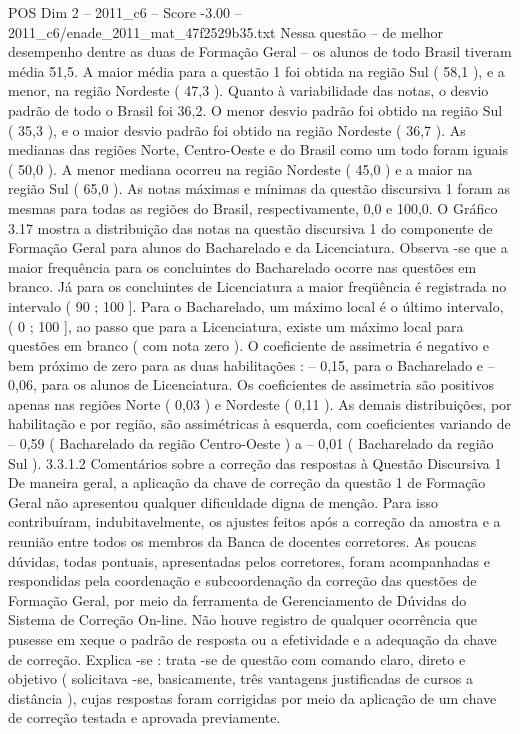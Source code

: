 \begin{textsample}{POS Dim 2 – 2011\_c6 – Score -3.00 – 2011\_c6/enade\_2011\_mat\_47f2529b35.txt}
Nessa questão – de melhor desempenho dentre as duas de Formação Geral – os alunos de todo Brasil tiveram média 51,5.
A maior média para a questão 1 foi obtida na região Sul ( 58,1 ), e a menor, na região Nordeste ( 47,3 ).
Quanto à variabilidade das notas, o desvio padrão de todo o Brasil foi 36,2.
O menor desvio padrão foi obtido na região Sul ( 35,3 ), e o maior desvio padrão foi obtido na região Nordeste ( 36,7 ).
As medianas das regiões Norte, Centro-Oeste e do Brasil como um todo foram iguais ( 50,0 ).
A menor mediana ocorreu na região Nordeste ( 45,0 ) e a maior na região Sul ( 65,0 ).
As notas máximas e mínimas da questão discursiva 1 foram as mesmas para todas as regiões do Brasil, respectivamente, 0,0 e 100,0.
O Gráfico 3.17 mostra a distribuição das notas na questão discursiva 1 do componente de Formação Geral para alunos do Bacharelado e da Licenciatura.
Observa -se que a maior frequência para os concluintes do Bacharelado ocorre nas questões em branco.
Já para os concluintes de Licenciatura a maior freqüência é registrada no intervalo ( 90 ; 100 ].
Para o Bacharelado, um máximo local é o último intervalo, ( 0 ; 100 ], ao passo que para a Licenciatura, existe um máximo local para questões em branco ( com nota zero ).
O coeficiente de assimetria é negativo e bem próximo de zero para as duas habilitações : – 0,15, para o Bacharelado e – 0,06, para os alunos de Licenciatura.
Os coeficientes de assimetria são positivos apenas nas regiões Norte ( 0,03 ) e Nordeste ( 0,11 ).
As demais distribuições, por habilitação e por região, são assimétricas à esquerda, com coeficientes variando de – 0,59 ( Bacharelado da região Centro-Oeste ) a – 0,01 ( Bacharelado da região Sul ). 3.3.1.2 Comentários sobre a correção das respostas à Questão Discursiva 1 De maneira geral, a aplicação da chave de correção da questão 1 de Formação Geral não apresentou qualquer dificuldade digna de menção.
Para isso contribuíram, indubitavelmente, os ajustes feitos após a correção da amostra e a reunião entre todos os membros da Banca de docentes corretores.
As poucas dúvidas, todas pontuais, apresentadas pelos corretores, foram acompanhadas e respondidas pela coordenação e subcoordenação da correção das questões de Formação Geral, por meio da ferramenta de Gerenciamento de Dúvidas do Sistema de Correção On-line.
Não houve registro de qualquer ocorrência que pusesse em xeque o padrão de resposta ou a efetividade e a adequação da chave de correção.
Explica -se : trata -se de questão com comando claro, direto e objetivo ( solicitava -se, basicamente, três vantagens justificadas de cursos a distância ), cujas respostas foram corrigidas por meio da aplicação de um chave de correção testada e aprovada previamente.

\end{textsample}
